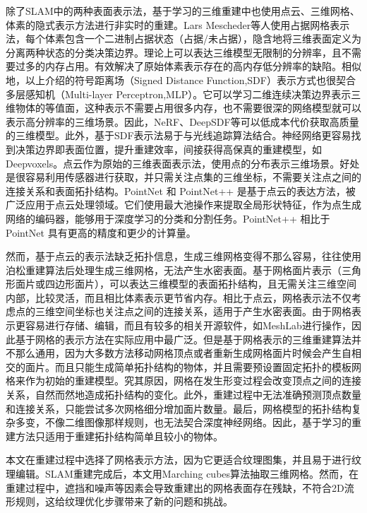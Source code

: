 除了SLAM中的两种表面表示法，基于学习的三维重建中也使用点云、三维网格、体素的隐式表示方法进行非实时的重建。Lars Mescheder等人使用占据网格表示法，每个体素包含一个二进制占据状态（占据/未占据），隐含地将三维表面定义为分离两种状态的分类决策边界。理论上可以表达三维模型无限制的分辨率，且不需要过多的内存占用。有效解决了原始体素表示存在的高内存低分辨率的缺陷。相似地，以上介绍的符号距离场（Signed Distance Function,SDF）表示方式也很契合多层感知机（Multi-layer Perceptron,MLP）。它可以学习二维连续决策边界表示三维物体的等值面，这种表示不需要占用很多内存，也不需要很深的网络模型就可以表示高分辨率的三维场景。因此，NeRF、DeepSDF等可以低成本代价获取高质量的三维模型。此外，基于SDF表示法易于与光线追踪算法结合。神经网络更容易找到决策边界即表面位置，提升重建效率，间接获得高保真的重建模型，如Deepvoxels。点云作为原始的三维表面表示法，使用点的分布表示三维场景。好处是很容易利用传感器进行获取，并只需关注点集的三维坐标，不需要关注点之间的连接关系和表面拓扑结构。PointNet 和 PointNet++ 是基于点云的表达方法，被广泛应用于点云处理领域。它们使用最大池操作来提取全局形状特征，作为点生成网络的编码器，能够用于深度学习的分类和分割任务。PointNet++ 相比于 PointNet 具有更高的精度和更少的计算量。\par


然而，基于点云的表示法缺乏拓扑信息，生成三维网格变得不那么容易，往往使用泊松重建算法后处理生成三维网格，无法产生水密表面。基于网格面片表示（三角形面片或四边形面片），可以表达三维模型的表面拓扑结构，且无需关注三维空间内部，比较灵活，而且相比体素表示更节省内存。相比于点云，网格表示法不仅考虑点的三维空间坐标也关注点之间的连接关系，适用于产生水密表面。由于网格表示更容易进行存储、编辑，而且有较多的相关开源软件，如MeshLab进行操作，因此基于网格的表示方法在实际应用中最广泛。但是基于网格表示的三维重建算法并不那么通用，因为大多数方法移动网格顶点或者重新生成网格面片时候会产生自相交的面片。而且只能生成简单拓扑结构的物体，并且需要预设置固定拓扑的模板网格来作为初始的重建模型。究其原因，网格在发生形变过程会改变顶点之间的连接关系，自然而然地造成拓扑结构的变化。此外，重建过程中无法准确预测顶点数量和连接关系，只能尝试多次网格细分增加面片数量。最后，网格模型的拓扑结构复杂多变，不像二维图像那样规则，也无法契合深度神经网络。因此，基于学习的重建方法只适用于重建拓扑结构简单且较小的物体。\par
本文在重建过程中选择了网格表示方法，因为它更适合纹理图集，并且易于进行纹理编辑。SLAM重建完成后，本文用Marching cubes算法抽取三维网格。然而，在重建过程中，遮挡和噪声等因素会导致重建出的网格表面存在残缺，不符合2D流形规则，这给纹理优化步骤带来了新的问题和挑战。

